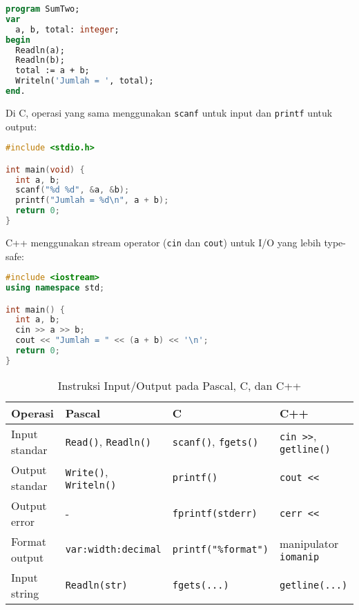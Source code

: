 \documentclass[../main.tex]{subfiles}
\begin{document}
\begin{lstlisting}[language=Pascal, caption={Menjumlah dua bilangan pada Pascal}]
program SumTwo;
var
  a, b, total: integer;
begin
  Readln(a);
  Readln(b);
  total := a + b;
  Writeln('Jumlah = ', total);
end.
\end{lstlisting}

Di C, operasi yang sama menggunakan \texttt{scanf} untuk input dan \texttt{printf} untuk output:

\begin{lstlisting}[language=C, caption={Menjumlah dua bilangan pada C}]
#include <stdio.h>

int main(void) {
  int a, b;
  scanf("%d %d", &a, &b);
  printf("Jumlah = %d\n", a + b);
  return 0;
}
\end{lstlisting}

C++ menggunakan stream operator (\texttt{cin} dan \texttt{cout}) untuk I/O yang lebih type-safe:

\begin{lstlisting}[language=C++, caption={Menjumlah dua bilangan pada C++}]
#include <iostream>
using namespace std;

int main() {
  int a, b;
  cin >> a >> b;
  cout << "Jumlah = " << (a + b) << '\n';
  return 0;
}
\end{lstlisting}

\begin{table}[H]
  \centering
  \small
  \caption{Instruksi Input/Output pada Pascal, C, dan C++}
  \begin{tabular}{@{}llll@{}}
    \toprule
    Operasi & Pascal & C & C++ \\
    \midrule
    Input standar & \texttt{Read()}, \texttt{Readln()} & \texttt{scanf()}, \texttt{fgets()} & \texttt{cin >>}, \texttt{getline()} \\
    Output standar & \texttt{Write()}, \texttt{Writeln()} & \texttt{printf()} & \texttt{cout <<} \\
    Output error & - & \texttt{fprintf(stderr)} & \texttt{cerr <<} \\
    Format output & \texttt{var:width:decimal} & \texttt{printf("\%format")} & manipulator \texttt{iomanip} \\
    Input string & \texttt{Readln(str)} & \texttt{fgets(...)} & \texttt{getline(...)} \\
    \bottomrule
  \end{tabular}
  \\\parencite{w3pascal-io,gnu-c-manual,cplusplus-io,cpp-iomanip}
\end{table}
\end{document}
